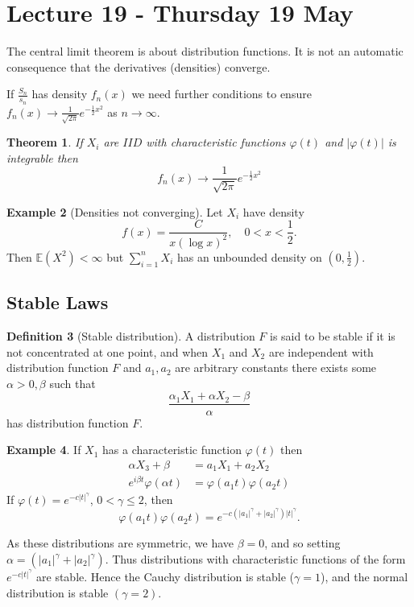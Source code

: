 \documentclass[10pt, oneside, reqno]{amsart}
\theoremstyle{plain}%
\newtheorem{thm}{Theorem}[section]
\theoremstyle{definition}
\newtheorem{defn}[thm]{Definition}
\newtheorem{exmp}[thm]{Example}
\theoremstyle{remark}
\renewcommand{\phi}{\varphi}
\newcommand{\E}{\mathbb{E}}
\begin{document}
\section{Lecture 19 - Thursday 19 May} %
\label{sec:lecture_19_thursday_19_may}
The central limit theorem is about distribution functions.  It is not an automatic consequence that the derivatives (densities) converge.  

If $\frac{S_n}{s_n}$ has density $f_n(x)$ we need further conditions to ensure $f_n(x) \rightarrow \frac{1}{\sqrt{2 \pi}} e^{- \frac{1}{2} x^2}$ as $n \rightarrow \infty$.  

\begin{thm}
    If $X_i$ are $IID$ with characteristic functions $\phi(t)$ and $|\phi(t)|$ is integrable then \[
        f_n(x) \rightarrow \frac{1}{\sqrt{2 \pi}} e^{-\frac{1}{2} x^2}
    \]
\end{thm}

\begin{exmp}[Densities not converging]
    Let $X_i$ have density \[
        f(x) = \frac{C}{x (\log x)^2}, \quad 0 < x < \frac{1}{2}.
    \] Then $\E(X^2) < \infty$ but $\sum_{i=1}^n X_i$ has an unbounded density on $(0, \frac{1}{2})$.
\end{exmp}

\subsection{Stable Laws} %
\label{sub:stable_laws}
\begin{defn}[Stable distribution]
    A distribution $F$ is said to be stable if it is not concentrated at one point, and when $X_1$ and $X_2$ are independent with distribution function $F$ and $a_1, a_2$ are arbitrary constants there exists some $\alpha > 0, \beta$ such that \[
        \frac{\alpha_1 X_1 + \alpha X_2 - \beta}{\alpha}
    \] has distribution function $F$.   
\end{defn}

\begin{exmp}
    If $X_1$ has a characteristic function $\phi(t)$ then \begin{align*}
        \alpha X_3 + \beta &= a_1 X_1 + a_2 X_2 \\
        e^{i \beta t} \phi(\alpha t) &= \phi(a_1 t) \phi(a_2 t)
    \end{align*}  If $\phi(t) = e^{-c|t|^\gamma}$, $0 < \gamma \leq 2$, then \[
        \phi(a_1 t) \phi(a_2 t) = e^{-c\left( |a_1|^\gamma + |a_2|^\gamma \right) |t|^\gamma}.
        \]

    As these distributions are symmetric, we have $\beta = 0$, and so setting $\alpha = (|a_1|^\gamma + |a_2|^\gamma)$.  Thus distributions with characteristic functions of the form $e^{-c|t|^\gamma}$ are stable.  Hence the Cauchy distribution is stable ($\gamma = 1$), and the normal distribution is stable $(\gamma = 2)$. 
\end{exmp}
\end{document}
